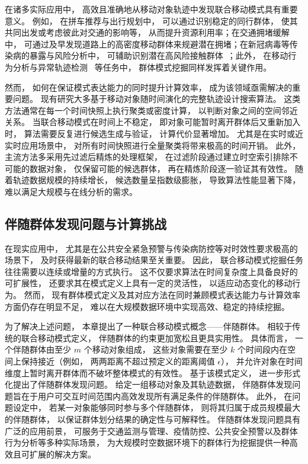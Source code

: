 在诸多实际应用中， 高效且准确地从移动对象轨迹中发现联合移动模式具有重要意义。 例如， 在拼车推荐与出行规划中， 可以通过识别稳定的同行群体， 使其共同出发或考虑彼此对交通的影响等， 从而提升资源利用率；在交通拥堵缓解中， 可通过及早发现道路上的高密度移动群体来规避潜在拥堵；在新冠病毒等传染病的暴露与风险分析中， 可辅助识别潜在高风险接触群体~；此外， 在移动行为分析与异常轨迹检测~ 等任务中， 群体模式挖掘同样发挥着关键作用。

然而， 如何在保证模式表达能力的同时提升计算效率， 成为该领域亟需解决的重要问题。 现有研究大多基于移动对象随时间演化的完整轨迹设计搜索算法。 这类方法通常在每一个时间快照上执行聚类或密度计算， 以判断对象之间的空间邻近关系。 当联合移动模式在时间上不稳定， 即对象可能暂时离开群体后又重新加入时， 算法需要反复进行候选生成与验证， 计算代价显著增加。 尤其是在实时或近实时应用场景中， 对所有时间快照进行全量聚类将带来极高的时间开销。 此外， 主流方法多采用先过滤后精炼的处理框架， 在过滤阶段通过建立时空索引排除不可能的数据对象， 仅保留可能的候选群体， 再在精炼阶段逐一验证其有效性。 随着轨迹数据规模的持续增长， 候选数量呈指数级膨胀， 导致算法性能显著下降， 难以满足大规模与在线分析的需求。



\subsection{伴随群体发现问题与计算挑战}
在现实应用中， 尤其是在公共安全紧急预警与传染病防控等对时效性要求极高的场景下， 及时获得最新的联合移动结果至关重要。 因此， 联合移动模式挖掘任务往往需要以连续或增量的方式执行。 这不仅要求算法在时间复杂度上具备良好的可扩展性， 还要求其在模式定义上具有一定的灵活性， 以适应动态变化的移动行为。 然而， 现有群体模式定义及其对应方法在同时兼顾模式表达能力与计算效率方面仍存在明显不足， 难以在大规模数据环境中实现高效、稳定的持续挖掘。

为了解决上述问题， 本章提出了一种联合移动模式概念——伴随群体。 相较于传统的联合移动模式定义， 伴随群体的约束更加宽松且更具实用性。 具体而言， 一个伴随群体由至少 $m$ 个移动对象组成， 这些对象需要在至少 $k$ 个时间段内在空间上保持接近（例如， 两两距离不超过预定义的距离阈值 $\epsilon$）， 并允许对象在时间维度上暂时离开群体而不破坏整体模式的有效性。 基于该模式定义， 进一步形式化提出了伴随群体发现问题。 给定一组移动对象及其轨迹数据， 伴随群体发现问题旨在于用户可交互时间范围内高效发现所有满足条件的伴随群体。 此外， 在问题设定中， 若某一对象能够同时参与多个伴随群体， 则将其归属于成员规模最大的伴随群体， 以保证群体划分结果的确定性与可解释性。 伴随群体发现问题具有广泛的应用前景， 可服务于交通监测与管理、疫情防控、公共安全预警以及群体行为分析等多种实际场景， 为大规模时空数据环境下的群体行为挖掘提供一种高效且可扩展的解决方案。


